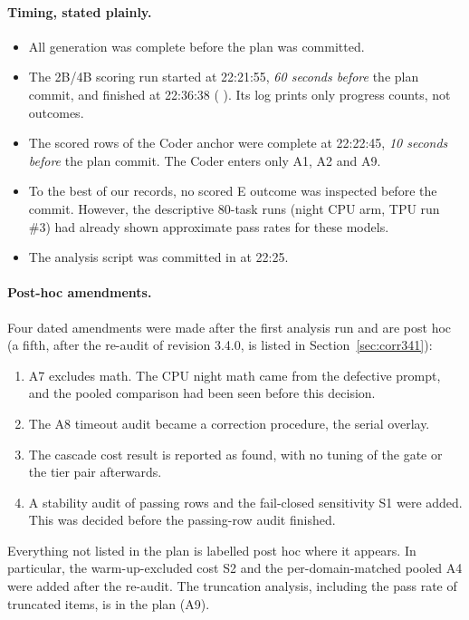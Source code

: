 \documentclass[11pt,a4paper]{article}
\newcommand{\code}[1]{\texttt{\detokenize{#1}}}
\begin{document}
\paragraph{Timing, stated plainly.}
\begin{itemize}
\item All generation was complete before the plan was committed.
\item The 2B/4B scoring run started at 22:21:55, \emph{60 seconds before} the plan commit, and
  finished at 22:36:38 (\code{results.json} \code{wall_clock}). Its log prints only progress
  counts, not outcomes.
\item The scored rows of the Coder anchor were complete at 22:22:45, \emph{10 seconds before} the
  plan commit. The Coder enters only A1, A2 and A9.
\item To the best of our records, no scored E outcome was inspected before the commit. However,
  the descriptive 80-task runs (night CPU arm, TPU run \#3) had already shown approximate pass
  rates for these models.
\item The analysis script was committed in \code{5e10ad2} at 22:25.
\end{itemize}

\paragraph{Post-hoc amendments.} Four dated amendments were made after the first analysis run and
are post hoc (a fifth, after the re-audit of revision 3.4.0, is listed in Section~\ref{sec:corr341}):
\begin{enumerate}
\item A7 excludes math. The CPU night math came from the defective prompt, and the pooled
  comparison had been seen before this decision.
\item The A8 timeout audit became a correction procedure, the serial overlay.
\item The cascade cost result is reported as found, with no tuning of the gate or the tier pair
  afterwards.
\item A stability audit of passing rows and the fail-closed sensitivity S1 were added. This was
  decided before the passing-row audit finished.
\end{enumerate}
Everything not listed in the plan is labelled post hoc where it appears. In particular, the
warm-up-excluded cost S2 and the per-domain-matched pooled A4 were added after the re-audit. The
truncation analysis, including the pass rate of truncated items, is in the plan (A9).
\end{document}
